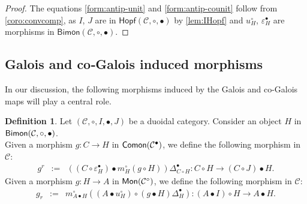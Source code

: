 \documentclass[nosumlimits,twoside]{amsart}
\theoremstyle{definition}
\newtheorem{definition}[definition]{\sc Definition}
\theoremstyle{remark}
\newcommand{\rd}[1]{{\color{red}{#1}}}
\newcommand{\Cc}{\mathcal{C}}
\def\Bimon{{\sf Bimon}}
\def\Comon{{\sf Comon}}
\def\Mon{{\sf Mon}}
\begin{document}
\begin{proof}
The equations \eqref{form:antip-unit} and \eqref{form:antip-counit} follow from \cref{coro:convcomp}, as $I$, $J$ are in $\mathsf{Hopf}(\Cc,\circ,\bullet)$ by \cref{lem:IHopf} and $u^\circ_H$, $\varepsilon^\bullet_H$ are morphisms in $\mathsf{Bimon}(\Cc,\circ,\bullet)$.
\end{proof}

\subsection{Galois and co‑Galois induced morphisms}

In our discussion, the following morphisms induced by the Galois and co-Galois maps will play a central role.

\begin{definition}
Let $(\Cc,\circ, I,\bullet,J)$ be a duoidal category. Consider an object $H$ in $\Bimon (\Cc,\circ,\bullet) $.\\
Given a
morphism $g:C\rightarrow H$  in $\Comon(\Cc^\bullet)$, we define the following morphism in $\Cc$:
\begin{eqnarray*}
g^{r} &:=&\left( \left( C\circ \varepsilon _{H}^{\bullet }\right) \bullet
m_{H}^{\circ }\left( g\circ H\right) \right) \Delta _{C\circ H}^{\bullet
}:C\circ H\rightarrow \left( C\circ J\right) \bullet H.
\end{eqnarray*}
Given a morphism  $g:H\rightarrow A$ in $\Mon(\Cc^\circ)$, we define the following morphism in $\Cc$:
\begin{eqnarray*}
g_{r}&:=&m_{A\bullet H}^{\circ }\left( \left( A\bullet u_{H}^{\circ }\right)
\circ \left( g\bullet H\right) \Delta _{H}^{\bullet }\right) :\left(
A\bullet I\right) \circ H\rightarrow A\bullet H.
\end{eqnarray*}
\end{definition}
\end{document}
